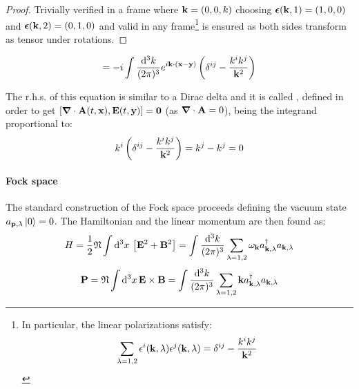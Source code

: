 \begin{proofbox}
  \begin{proof}
    Trivially verified in a frame where $ \mathbf{k} = (0,0,k) $ choosing $ \boldsymbol{\epsilon}(\mathbf{k},1) = (1,0,0) $ and $ \boldsymbol{\epsilon}(\mathbf{k},2) = (0,1,0) $ and valid in any frame\footnote{In particular, the linear polarizations satisfy:
    \begin{equation}
      \sum_{\lambda = 1,2} \epsilon^i(\mathbf{k},\lambda) \epsilon^j(\mathbf{k},\lambda) = \delta^{ij} - \frac{k^i k^j}{\mathbf{k}^2}
    \end{equation}} is ensured as both sides transform as tensor under rotations.
  \end{proof}
\end{proofbox}

\begin{proposition}[before upper = {\tcbtitle}]{}{}
  \begin{equation}
    [A^i(t,\ve{x}) , E^j(t,\ve{y})] = - i \int \frac{\dd^3k}{(2\pi)^3} e^{i \ve{k} \cdot (\ve{x} - \ve{y})} \left( \delta^{ij} - \frac{k^i k^j}{\ve{k}^2} \right)
  \end{equation}
\end{proposition}

The r.h.s. of this equation is similar to a Dirac delta and it is called , defined in order to get $ [\boldsymbol{\nabla}\cdot \mathbf{A}(t,\mathbf{x}) , \mathbf{E}(t,\mathbf{y})] = \mathbf{0} $ (as $ \boldsymbol{\nabla}\cdot \mathbf{A} = 0 $), being the integrand proportional to:
\begin{equation*}
  k^i \left( \delta^{ij} - \frac{k^i k^j}{\mathbf{k}^2} \right) = k^j - k^j = 0
\end{equation*}

\paragraph{Fock space}

The standard construction of the Fock space proceeds defining the vacuum state $ a_{\mathbf{p},\lambda} \ket{0} = 0 $. The Hamiltonian and the linear momentum are then found as:
\begin{equation}
  H = \frac{1}{2} \mathfrak{N} \int \mathrm{d}^3x\, \left[ \mathbf{E}^2 + \mathbf{B}^2 \right] = \int \frac{\mathrm{d}^3k}{(2\pi)^3} \sum_{\lambda = 1,2} \omega_{\mathbf{k}} a_{\mathbf{k},\lambda}^\dagger a_{\mathbf{k},\lambda}
\end{equation}
\begin{equation}
  \mathbf{P} = \mathfrak{N} \int \mathrm{d}^3x\, \mathbf{E} \times \mathbf{B} = \int \frac{\mathrm{d}^3k}{(2\pi)^3} \sum_{\lambda = 1,2} \mathbf{k} a_{\mathbf{k},\lambda}^\dagger a_{\mathbf{k},\lambda}
\end{equation}

